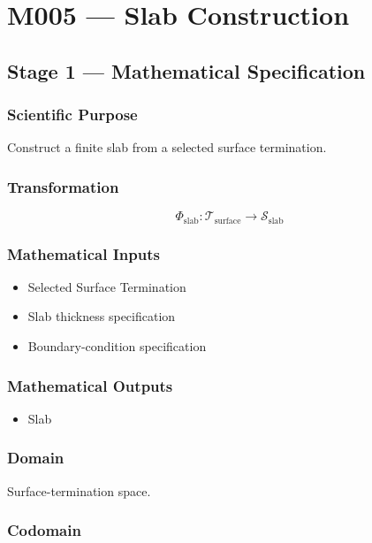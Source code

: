 \chapter{M005 --- Slab Construction}

\section{Stage 1 --- Mathematical Specification}

\subsection{Scientific Purpose}

Construct a finite slab from a selected surface termination.

\subsection{Transformation}

\[
\Phi_{\mathrm{slab}} :
\mathcal{T}_{\mathrm{surface}}
\rightarrow
\mathcal{S}_{\mathrm{slab}}
\]

\subsection{Mathematical Inputs}

\begin{itemize}
\item Selected Surface Termination
\item Slab thickness specification
\item Boundary-condition specification
\end{itemize}

\subsection{Mathematical Outputs}

\begin{itemize}
\item Slab
\end{itemize}

\subsection{Domain}

Surface-termination space.

\subsection{Codomain}

